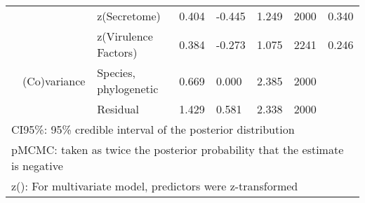 \begin{table}
\begin{tabular}[t]{llllllll}
\hspace{1em} &  & z(Secretome) & 0.404 & -0.445 & 1.249 & 2000 & 0.340\\
\hspace{1em} &  & z(Virulence Factors) & 0.384 & -0.273 & 1.075 & 2241 & 0.246\\
\hspace{1em} & (Co)variance & Species, phylogenetic & 0.669 & 0.000 & 2.385 & 2000 & \\
\hspace{1em} &  & Residual & 1.429 & 0.581 & 2.338 & 2000 & \\
\bottomrule
\multicolumn{8}{l}{\rule{0pt}{1em}CI95\%: 95\% credible interval of the posterior distribution}\\
\multicolumn{8}{l}{\rule{0pt}{1em}pMCMC: taken as twice the posterior probability that the estimate is negative}\\
\multicolumn{8}{l}{\rule{0pt}{1em}z(): For multivariate model, predictors were z-transformed}\\
\end{tabular}
\end{table}
